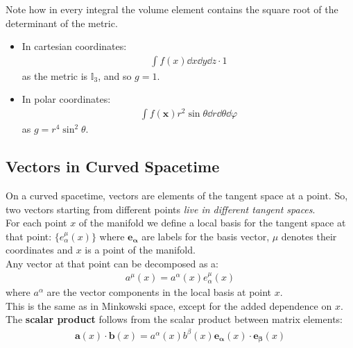 \documentclass[../template.tex]{subfiles}
\begin{document}
\begin{expl}
    Note how in every integral the volume element contains the square root of the determinant of the metric.
    \begin{itemize}
        \item In cartesian coordinates:
        \begin{align*}
            \int f(x) \dd{x}\dd{y}\dd{z} \cdot 1
        \end{align*}
        as the metric is $\mathbb{I}_3$, and so $g = 1$.
        \item In polar coordinates:
        \begin{align*}
            \int f(\bm{x}) r^2 \sin \theta \dd{r}\dd{\theta}\dd{\varphi}
        \end{align*}
        as $g = r^4 \sin^2 \theta$. 
    \end{itemize}
\end{expl}

\subsection{Vectors in Curved Spacetime}
On a curved spacetime, vectors are elements of the tangent space at a point. So, two vectors starting from different points \textit{live in different tangent spaces}.\\

For each point $x$ of the manifold we define a local basis for the tangent space at that point: $\{e^\mu_\alpha(x)\}$ where $\bm{e_\alpha}$ are labels for the basis vector, $\mu$ denotes their coordinates and $x$ is a point of the manifold.\\

Any vector at that point can be decomposed as a:
\begin{align*}
    a^\mu (x) = a^\alpha (x) e^\mu_\alpha (x)
\end{align*}
where $a^\alpha$ are the vector components in the local basis at point $x$.\\
This is the same as in Minkowski space, except for the added dependence on $x$.\\

The \textbf{scalar product} follows from the scalar product between matrix elements:
\begin{align*}
    \bm{a}(x) \cdot \bm{b}(x) = a^\alpha(x) b^\beta(x) \bm{e_\alpha}(x) \cdot \bm{e_\beta}(x)
\end{align*}
\end{document}
